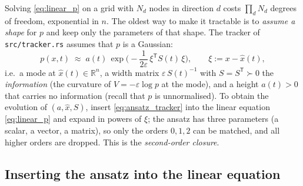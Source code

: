 \documentclass[11pt,a4paper]{article}
\newcommand{\R}{\mathbb{R}}
\newcommand{\T}{^{\mathsf T}}
\newcommand{\xh}{\hat{x}}
\newcommand{\eps}{\varepsilon}
\theoremstyle{plain}
\theoremstyle{definition}
\theoremstyle{remark}
\begin{document}
Solving \eqref{eq:linear_p} on a grid with $N_d$ nodes in direction $d$ costs $\prod_dN_d$ degrees of freedom, exponential in $n$. The oldest way to make it tractable is to \emph{assume a shape} for $p$ and keep only the parameters of that shape. The tracker of \texttt{src/tracker.rs} assumes that $p$ is a Gaussian:
\begin{equation}
  p(x,t) \;\approx\; a(t)\,\exp\Big(-\frac{1}{2\eps}\,\xi\T S(t)\,\xi\Big), \qquad \xi := x-\xh(t),
  \label{eq:ansatz_tracker}
\end{equation}
i.e.\ a mode at $\xh(t)\in\R^n$, a width matrix $\eps\,S(t)^{-1}$ with $S=S\T\succ0$ the \emph{information} (the curvature of $V=-\eps\log p$ at the mode), and a height $a(t)>0$ that carries no information (recall that $p$ is unnormalised). To obtain the evolution of $(a,\xh,S)$, insert \eqref{eq:ansatz_tracker} into the linear equation \eqref{eq:linear_p} and expand in powers of $\xi$; the ansatz has three parameters (a scalar, a vector, a matrix), so only the orders $0,1,2$ can be matched, and all higher orders are dropped. This is the \emph{second-order closure}.

\subsection{Inserting the ansatz into the linear equation}
\end{document}
